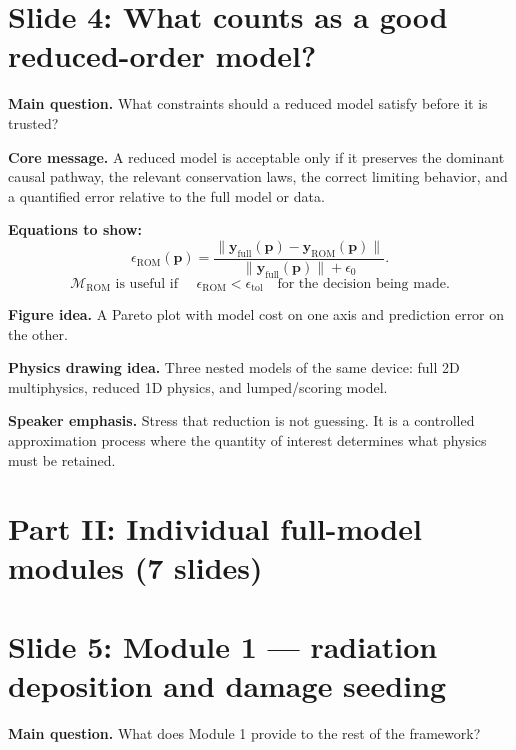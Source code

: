 \documentclass[11pt]{article}
\begin{document}
\section{Slide 4: What counts as a good reduced-order model?}
\begin{physicsbox}
\textbf{Main question.} What constraints should a reduced model satisfy before it is trusted?
\end{physicsbox}

\textbf{Core message.} A reduced model is acceptable only if it preserves the dominant causal pathway, the relevant conservation laws, the correct limiting behavior, and a quantified error relative to the full model or data.

\textbf{Equations to show:}
\begin{equation*}
\epsilon_{\mathrm{ROM}}(\mathbf{p})
=
\frac{\|\mathbf{y}_{\mathrm{full}}(\mathbf{p})-
\mathbf{y}_{\mathrm{ROM}}(\mathbf{p})\|}{\|\mathbf{y}_{\mathrm{full}}(\mathbf{p})\|+\epsilon_0}.
\end{equation*}
\begin{equation*}
\mathcal{M}_{\mathrm{ROM}}\text{ is useful if }\quad
\epsilon_{\mathrm{ROM}} < \epsilon_{\mathrm{tol}}
\quad\text{for the decision being made.}
\end{equation*}

\textbf{Figure idea.} A Pareto plot with model cost on one axis and prediction error on the other.

\textbf{Physics drawing idea.} Three nested models of the same device: full 2D multiphysics, reduced 1D physics, and lumped/scoring model.

\textbf{Speaker emphasis.} Stress that reduction is not guessing. It is a controlled approximation process where the quantity of interest determines what physics must be retained.

\section{Part II: Individual full-model modules (7 slides)}

\section{Slide 5: Module 1 --- radiation deposition and damage seeding}
\begin{physicsbox}
\textbf{Main question.} What does Module 1 provide to the rest of the framework?
\end{physicsbox}
\end{document}
